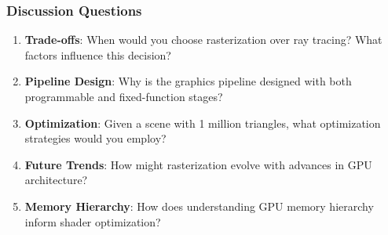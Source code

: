 \begin{frame}
\frametitle{Discussion Questions}

\begin{enumerate}
    \item \textbf{Trade-offs}: When would you choose rasterization over ray tracing? What factors influence this decision?
    
    \vspace{0.3cm}
    
    \item \textbf{Pipeline Design}: Why is the graphics pipeline designed with both programmable and fixed-function stages?
    
    \vspace{0.3cm}
    
    \item \textbf{Optimization}: Given a scene with 1 million triangles, what optimization strategies would you employ?
    
    \vspace{0.3cm}
    
    \item \textbf{Future Trends}: How might rasterization evolve with advances in GPU architecture?
    
    \vspace{0.3cm}
    
    \item \textbf{Memory Hierarchy}: How does understanding GPU memory hierarchy inform shader optimization?
\end{enumerate}

\end{frame}

